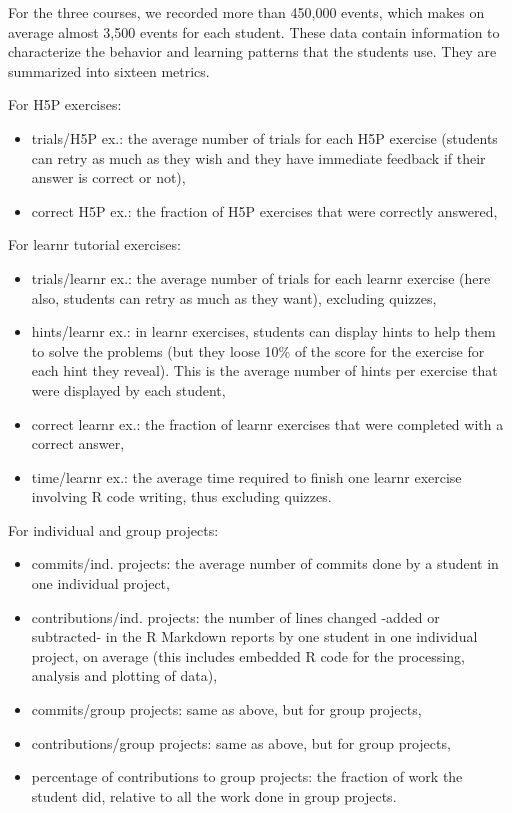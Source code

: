 \documentclass{aims}
\theoremstyle{definition}
\begin{document}
For the three courses, we recorded more than 450,000 events, which makes
on average almost 3,500 events for each student. These data contain
information to characterize the behavior and learning patterns that the
students use. They are summarized into sixteen metrics.

For H5P exercises:

\begin{itemize}
\item
  trials/H5P ex.: the average number of trials for each H5P exercise
  (students can retry as much as they wish and they have immediate
  feedback if their answer is correct or not),
\item
  correct H5P ex.: the fraction of H5P exercises that were correctly
  answered,
\end{itemize}

For learnr tutorial exercises:

\begin{itemize}
\item
  trials/learnr ex.: the average number of trials for each learnr
  exercise (here also, students can retry as much as they want),
  excluding quizzes,
\item
  hints/learnr ex.: in learnr exercises, students can display hints to
  help them to solve the problems (but they loose 10\% of the score for
  the exercise for each hint they reveal). This is the average number of
  hints per exercise that were displayed by each student,
\item
  correct learnr ex.: the fraction of learnr exercises that were
  completed with a correct answer,
\item
  time/learnr ex.: the average time required to finish one learnr
  exercise involving R code writing, thus excluding quizzes.
\end{itemize}

For individual and group projects:

\begin{itemize}
\item
  commits/ind. projects: the average number of commits done by a student
  in one individual project,
\item
  contributions/ind. projects: the number of lines changed -added or
  subtracted- in the R Markdown reports by one student in one individual
  project, on average (this includes embedded R code for the processing,
  analysis and plotting of data),
\item
  commits/group projects: same as above, but for group projects,
\item
  contributions/group projects: same as above, but for group projects,
\item
  percentage of contributions to group projects: the fraction of work
  the student did, relative to all the work done in group projects.
\end{itemize}
\end{document}
